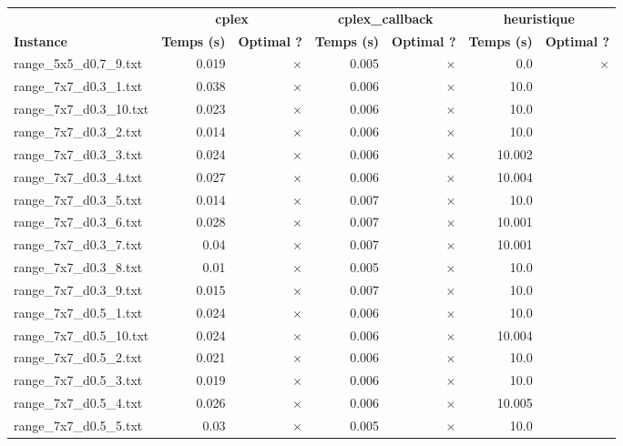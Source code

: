 \documentclass{article}
\begin{document}
\newpage
\begin{center}
\renewcommand{\arraystretch}{1.4} 
 \begin{tabular}{lrrrrrr}
	\hline
 & \multicolumn{2}{c}{\textbf{cplex}} & \multicolumn{2}{c}{\textbf{cplex_callback}} & \multicolumn{2}{c}{\textbf{heuristique}}\\
\textbf{Instance}  & \textbf{Temps (s)} & \textbf{Optimal ?}  & \textbf{Temps (s)} & \textbf{Optimal ?}  & \textbf{Temps (s)} & \textbf{Optimal ?} \\\hline

range\_5x5\_d0.7\_9.txt & 0.019 & 
$\times$
 & 0.005 & 
$\times$
 & 0.0 & 
$\times$
\\
range\_7x7\_d0.3\_1.txt & 0.038 & 
$\times$
 & 0.006 & 
$\times$
 & 10.0 & 
\\
range\_7x7\_d0.3\_10.txt & 0.023 & 
$\times$
 & 0.006 & 
$\times$
 & 10.0 & 
\\
range\_7x7\_d0.3\_2.txt & 0.014 & 
$\times$
 & 0.006 & 
$\times$
 & 10.0 & 
\\
range\_7x7\_d0.3\_3.txt & 0.024 & 
$\times$
 & 0.006 & 
$\times$
 & 10.002 & 
\\
range\_7x7\_d0.3\_4.txt & 0.027 & 
$\times$
 & 0.006 & 
$\times$
 & 10.004 & 
\\
range\_7x7\_d0.3\_5.txt & 0.014 & 
$\times$
 & 0.007 & 
$\times$
 & 10.0 & 
\\
range\_7x7\_d0.3\_6.txt & 0.028 & 
$\times$
 & 0.007 & 
$\times$
 & 10.001 & 
\\
range\_7x7\_d0.3\_7.txt & 0.04 & 
$\times$
 & 0.007 & 
$\times$
 & 10.001 & 
\\
range\_7x7\_d0.3\_8.txt & 0.01 & 
$\times$
 & 0.005 & 
$\times$
 & 10.0 & 
\\
range\_7x7\_d0.3\_9.txt & 0.015 & 
$\times$
 & 0.007 & 
$\times$
 & 10.0 & 
\\
range\_7x7\_d0.5\_1.txt & 0.024 & 
$\times$
 & 0.006 & 
$\times$
 & 10.0 & 
\\
range\_7x7\_d0.5\_10.txt & 0.024 & 
$\times$
 & 0.006 & 
$\times$
 & 10.004 & 
\\
range\_7x7\_d0.5\_2.txt & 0.021 & 
$\times$
 & 0.006 & 
$\times$
 & 10.0 & 
\\
range\_7x7\_d0.5\_3.txt & 0.019 & 
$\times$
 & 0.006 & 
$\times$
 & 10.0 & 
\\
range\_7x7\_d0.5\_4.txt & 0.026 & 
$\times$
 & 0.006 & 
$\times$
 & 10.005 & 
\\
range\_7x7\_d0.5\_5.txt & 0.03 & 
$\times$
 & 0.005 & 
$\times$
 & 10.0 & 
\\

\end{tabular}
\end{center}
\end{document}
